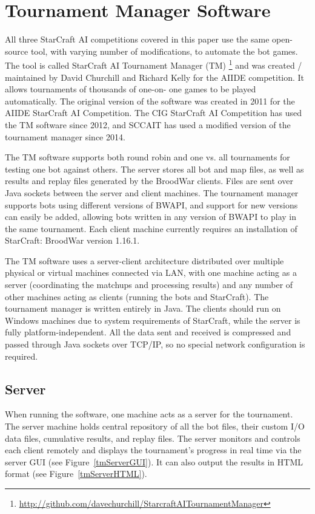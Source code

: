 \section{Tournament Manager Software}\label{secTournamentManagerSoftware}

All three StarCraft AI competitions covered in this paper use the same open-source tool, with varying number of modifications, to automate the bot games. The tool is called StarCraft AI Tournament Manager (TM) \footnote{\url{http://github.com/davechurchill/StarcraftAITournamentManager}} and was created / maintained by David Churchill and Richard Kelly for the AIIDE competition. It allows tournaments of thousands of one-on- one games to be played automatically. The original version of the software was created in 2011 for the AIIDE StarCraft AI Competition. The CIG StarCraft AI Competition has used the TM software since 2012, and SCCAIT has used a modified version of the tournament manager since 2014. 

The TM software supports both round robin and one vs. all tournaments for testing one bot against others. The server stores all bot and map files, as well as results and replay files generated by the BroodWar clients. Files are sent over Java sockets between the server and client machines. The tournament manager supports bots using different versions of BWAPI, and support for new versions can easily be added, allowing bots written in any version of BWAPI to play in the same tournament. Each client machine currently requires an installation of StarCraft: BroodWar version 1.16.1.

The TM software uses a server-client architecture distributed over multiple physical or virtual machines connected via LAN, with one machine acting as a server (coordinating the matchups and processing results) and any number of other machines acting as clients (running the bots and StarCraft). The tournament manager is written entirely in Java. The clients should run on Windows machines due to system requirements of StarCraft, while the server is fully platform-independent. All the data sent and received is compressed and passed through Java sockets over TCP/IP, so no special network configuration is required.

\subsection{Server}

When running the software, one machine acts as a server for the tournament. The server machine holds central repository of all the bot files, their custom I/O data files, cumulative results, and replay files. The server monitors and controls each client remotely and displays the tournament's progress in real time via the server GUI (see Figure~\ref{tmServerGUI}). It can also output the results in HTML format (see Figure~\ref{tmServerHTML}).

